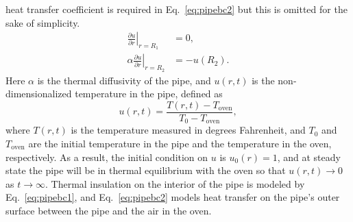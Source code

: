 \documentclass[11pt]{article}
\begin{document}
\begin{enumerate}
{    heat transfer coefficient is required in Eq.~\ref{eq:pipebc2} but this is
    omitted for the sake of simplicity.}
    \begin{align}
      \left.\frac{\partial u}{\partial r}\right|_{r=R_1} &= 0, \label{eq:pipebc1} \\
      \left.\alpha \frac{\partial u}{\partial r}\right|_{r=R_2} &= -u(R_2). \label{eq:pipebc2}
    \end{align}
    Here $\alpha$ is the thermal diffusivity of the pipe, and $u(r,t)$ is the
    non-dimensionalized temperature in the pipe, defined as
    \begin{equation}
      u(r,t) = \frac{T(r,t) - T_\text{oven}}{T_0 - T_\text{oven}},
    \end{equation}
    where $T(r,t)$ is the temperature measured in degrees Fahrenheit, and $T_0$
    and $T_\text{oven}$ are the initial temperature in the pipe and the
    temperature in the oven, respectively. As a result, the initial condition
    on $u$ is $u_0(r) = 1$, and at steady state the pipe will be in thermal
    equilibrium with the oven so that $u(r,t) \to 0$ as $t \to \infty$. Thermal
    insulation on the interior of the pipe is modeled by Eq.~\ref{eq:pipebc1},
    and Eq.~\ref{eq:pipebc2} models heat transfer on the pipe's outer surface
    between the pipe and the air in the oven.


\end{enumerate}
\end{document}
